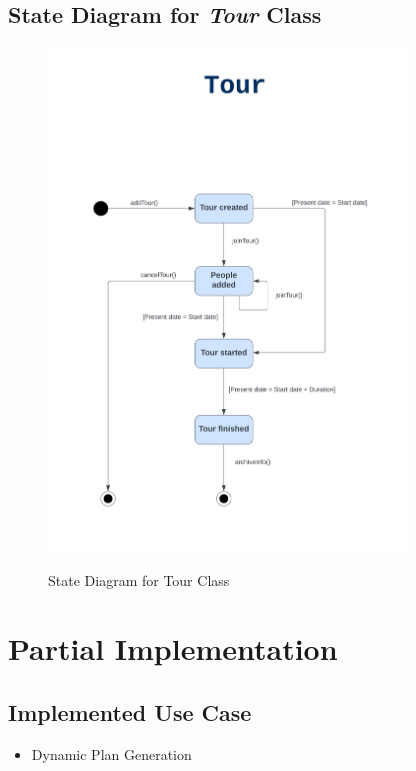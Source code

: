 \documentclass[12pt]{article}
\begin{document}
\subsection{State Diagram for \emph{Tour} Class}
\begin{figure}[H]
    \centering
        \includegraphics[width=0.85\textwidth]{State Diagram/tour.png}
        \label{fig:StateTour}
    \caption{State Diagram for Tour Class}
\end{figure}

\newpage

\section{Partial Implementation}
\subsection{Implemented Use Case}

\begin{itemize}
    \item Dynamic Plan Generation
\end{itemize}
\end{document}
